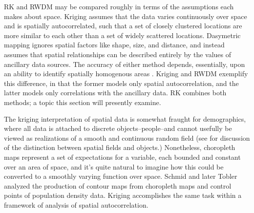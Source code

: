 \documentclass[draft]{article}
\begin{document}
RK and RWDM may be compared roughly in terms of the assumptions each makes about space.  Kriging assumes that the data varies continuously over space and is spatially autocorrelated, such that a set of closely clustered locations are more similar to each other than a set of widely scattered locations.  Dasymetric mapping ignores spatial factors like shape, size, and distance, and instead assumes that spatial relationships can be described entirely by the values of ancillary data sources.  The accuracy of either method depends, essentially, upon an ability to identify spatially homogenous areas \cite{maantay07, maantay08}.  Kriging and RWDM exemplify this difference, in that the former models only spatial autocorrelation, and the latter models only correlations with the ancillary data.  RK combines both methods; a topic this section will presently examine.

The kriging interpretation of spatial data is somewhat fraught for demographics, where all data is attached to discrete objects--people--and cannot usefully be viewed as realizations of a smooth and continuous random field (see \cite{cova02, kjenstad06} for discussion of the distinction between spatial fields and objects.)  Nonetheless, choropleth maps represent a set of expectations for a variable, each bounded and constant over an area of space, and it's quite natural to imagine how this could be converted to a smoothly varying function over space.  Schmid \cite{schmid55} and later Tobler \cite{tobler79} analyzed the production of contour maps from choropleth maps and control points of population density data.  Kriging accomplishes the same task within a framework of analysis of spatial autocorrelation.
\end{document}
